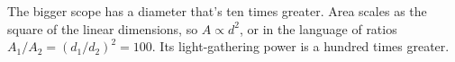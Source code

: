 The bigger scope has a diameter that's ten times
greater. Area scales as the square of the linear dimensions, so $A\propto d^2$,
or in the language of ratios $A_1/A_2 = (d_1/d_2)^2=100$.
Its light-gathering power is a hundred times greater.
